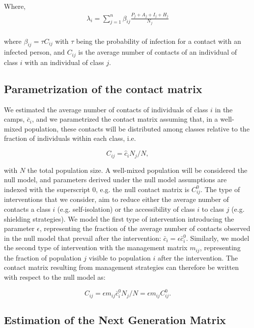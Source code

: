 \documentclass{article}
\begin{document}
Where, 
\\
\begin{gather}
   \lambda_i = \sum_{j = 1}^n \beta_{ij} \frac{P_j + A_j + I_j + H_j}{N_j}
\end{gather}
\\

where $\beta_{ij}=\tau C_{ij}$ with $\tau$ being the probability of infection for a contact with an infected person, and $C_{ij}$ is the average number of contacts of an individual of class $i$ with an individual of class $j$. 

\subsection*{Parametrization of the contact matrix}

We estimated the average number of contacts of individuals of class $i$ in the camps, $\bar{c}_i$, and we parametrized the contact matrix assuming that, in a well-mixed population, these contacts will be distributed among classes relative to the fraction of individuals within each class, i.e.

\begin{equation}
C_{ij} = \hat{c}_i N_j/N,
\end{equation}

with $N$ the total population size. A well-mixed population will be considered the null model, and parameters derived under the null model assumptions are indexed with the superscript $0$, e.g. the null contact matrix is $C^0_{ij}$. The type of interventions that we consider, aim to reduce either the average number of contacts a class $i$ (e.g. self-isolation) or the accessibility of class $i$ to class $j$ (e.g. shielding strategies). We model the first type of intervention introducing the parameter $\epsilon$, representing the fraction of the average number of contacts observed in the null model that prevail after the intervention: $\bar{c}_i = \epsilon \bar{c}^0_i$. Similarly, we model the second type of intervention with the management matrix $m_{ij}$, representing the fraction of population $j$ visible to population $i$ after the intervention. The contact matrix resulting from management strategies can therefore be written with respect to the null model as:

\begin{equation}
C_{ij} =\epsilon m_{ij} \bar{c}^0_i N_j/N = \epsilon m_{ij} C^0_{ij}.
\end{equation}

\subsection*{Estimation of the Next Generation Matrix}
\end{document}
